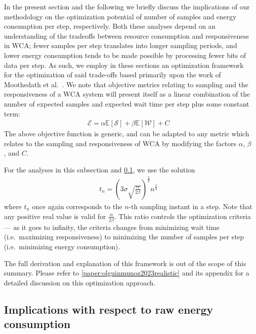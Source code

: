 In the present section and the following we briefly discuss the implications of our methodology on the optimization potential of number of samples and energy consumption per step, respectively.
Both these analyses depend on an understanding of the tradeoffs between resource consumption and responsiveness in \gls{WCA};
fewer samples per step translates into longer sampling periods, and lower energy consumption tends to be made possible by processing fewer bits of data per step.
As such, we employ in these sections an optimization framework for the optimization of said trade-offs based primarily upon the work of Moothedath et al.~\cite{moothedath2021energy,moothedath2022energy1,moothedath2022energy2}.
We note that objective metrics relating to sampling and the responsiveness of a \gls{WCA} system will present itself as a linear combination of the number of expected samples and expected wait time per step plus some constant term:
\begin{align}
    \mathcal{E} = \alpha\mathbb{E}[\mathcal{S}] + \beta\mathbb{E}[\mathcal{W}] + C\label{eq:genericopt}
\end{align}
The above objective function is generic, and can be adapted to any metric which relates to the sampling and responsiveness of \gls{WCA} by modifying the factors \ensuremath{\alpha}, \ensuremath{\beta}, and \ensuremath{C}.

For the analyses in this subsection and \cref{ssec:implications:energy}, we use the solution
\begin{align}
    t_n = \left( 3\sigma\sqrt {\frac{\alpha}{2\beta}} \right)^{\frac{2}{3}} n^{\frac{2}{3}}
\end{align}
where \ensuremath{t_n} once again corresponds to the \ensuremath{n}-th sampling instant in a step.
Note that any positive real value is valid for \ensuremath{\frac{\alpha}{2\beta}}.
This ratio controls the optimization criteria --- as it goes to infinity, the criteria changes from minimizing wait time (i.e.\ maximizing responsiveness) to minimizing the number of samples per step (i.e.\ minimizing energy consumption).

The full derivation and explanation of this framework is out of the scope of this summary.
Please refer to \cref{paper:olguinmunoz2023realistic} and its appendix for a detailed discussion on this optimization approach.

\medskip





\subsection{Implications with respect to raw energy consumption}\label{ssec:implications:energy}
